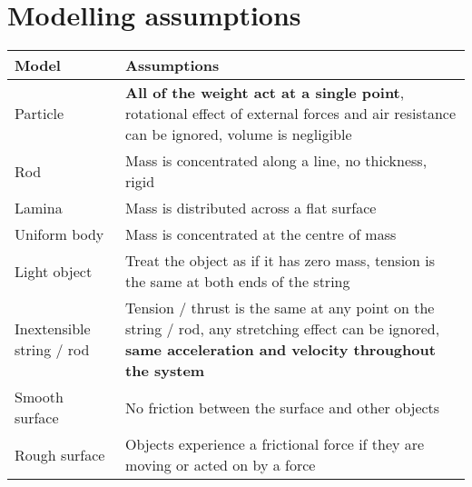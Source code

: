 \section{Modelling assumptions}
\begin{tabular}{|m{3.9cm} | m{13.5cm}|}
    \hline
    \textbf{Model}            & \textbf{Assumptions}                                                                                                                                                                                    \\
    \hline
    Particle                  & \textbf{All of the weight act at a single point}, rotational effect of external forces and air resistance can be ignored, volume is negligible                                                      \\
    \hline
    Rod                       & Mass is concentrated along a line, no thickness, rigid                                                                                                                                                  \\
    \hline
    Lamina                    & Mass is distributed across a flat surface                                                                                                                                                               \\
    \hline
    Uniform body              & Mass is concentrated at the centre of mass                                                                                                                                                              \\
    \hline
    Light object              & Treat the object as if it has zero mass, tension is the same at both ends of the string                                                                                                                 \\
    \hline
    Inextensible string / rod & Tension / thrust is the same at any point on the string / rod, any stretching effect can be ignored, \textbf{same acceleration and velocity throughout the system}                                      \\
    \hline
    Smooth surface            & No friction between the surface and other objects                                                                                                                                                       \\
    \hline
    Rough surface             & Objects experience a frictional force if they are moving or acted on by a force                                                                                                                         \\

\end{tabular}
